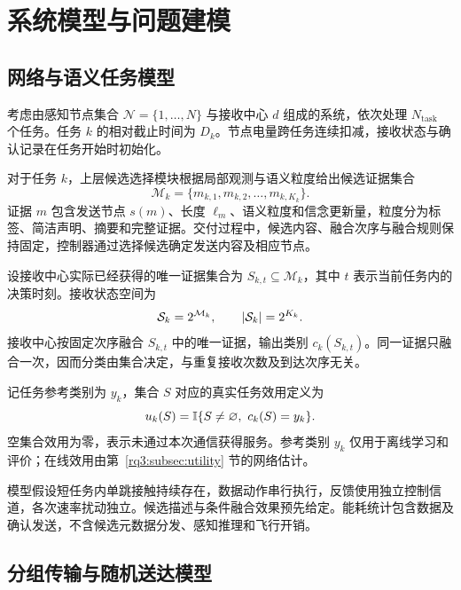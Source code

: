 \section{系统模型与问题建模}
\label{rq3:sec:model}

\subsection{网络与语义任务模型}
\label{rq3:subsec:tasks}

考虑由感知节点集合 $\mathcal N=\{1,\ldots,N\}$ 与接收中心 $d$ 组成的系统，依次处理 $N_{\mathrm{task}}$ 个任务。任务 $k$ 的相对截止时间为 $D_k$。节点电量跨任务连续扣减，接收状态与确认记录在任务开始时初始化。

对于任务 $k$，上层候选选择模块根据局部观测与语义粒度给出候选证据集合
\begin{equation}
  \mathcal{M}_k=\{m_{k,1},m_{k,2},\ldots,m_{k,K_k}\}.
  \label{rq3:eq:candidates}
\end{equation}
证据 $m$ 包含发送节点 $s(m)$、长度 $\ell_m$、语义粒度和信念更新量，粒度分为标签、简洁声明、摘要和完整证据。交付过程中，候选内容、融合次序与融合规则保持固定，控制器通过选择候选确定发送内容及相应节点。

设接收中心实际已经获得的唯一证据集合为 $S_{k,t}\subseteq\mathcal{M}_k$，其中 $t$ 表示当前任务内的决策时刻。接收状态空间为
\begin{equation}
  \mathcal{S}_k=2^{\mathcal{M}_k},\qquad |\mathcal{S}_k|=2^{K_k}.
  \label{rq3:eq:state-space}
\end{equation}
接收中心按固定次序融合 $S_{k,t}$ 中的唯一证据，输出类别 $c_k(S_{k,t})$。同一证据只融合一次，因而分类由集合决定，与重复接收次数及到达次序无关。

记任务参考类别为 $y_k$，集合 $S$ 对应的真实任务效用定义为
\begin{equation}
  u_k(S)=\mathbb{I}\{S\ne\varnothing,\ c_k(S)=y_k\}.
  \label{rq3:eq:true-utility}
\end{equation}
空集合效用为零，表示未通过本次通信获得服务。参考类别 $y_k$ 仅用于离线学习和评价；在线效用由第~\ref{rq3:subsec:utility} 节的网络估计。

模型假设短任务内单跳接触持续存在，数据动作串行执行，反馈使用独立控制信道，各次速率扰动独立。候选描述与条件融合效果预先给定。能耗统计包含数据及确认发送，不含候选元数据分发、感知推理和飞行开销。

\subsection{分组传输与随机送达模型}
\label{rq3:subsec:channel}

